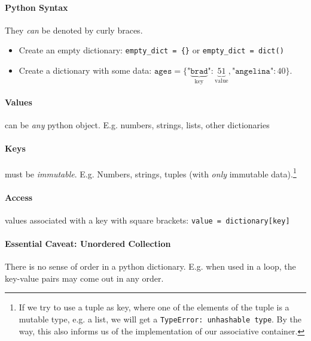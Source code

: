 \documentclass[12pt,letterpaper,twoside]{article}
\begin{document}
\vspace{-2ex}
\paragraph{Python Syntax}
They \emph{can} be denoted by curly braces.

\begin{itemize}
  \item
    Create an empty dictionary: \texttt{empty\_dict\ =\ \{\}} or
    \texttt{empty\_dict\ =\ dict()}
  \item
    Create a dictionary with some data:
      $\texttt{ages} = \{ \texttt{"}\underbrace{\texttt{brad}}_{\textrm{key}}\texttt{"} : \underbrace{51}_{\textrm{value}}, \texttt{"angelina"} : 40 \}$.
\end{itemize}

\vspace{-5ex}
\paragraph{Values} can be \emph{any} python object. E.g. numbers, strings, lists, other dictionaries

\vspace{-2ex}
\paragraph{Keys} must be \emph{immutable}. 
E.g. Numbers, strings, tuples (with \emph{only} immutable data).\footnote{If we try to use a tuple as key, where one of the elements of the tuple
is a mutable type, e.g. a list, we will get a \texttt{TypeError: unhashable type}. By the way, this also informs us of the implementation of our associative container.}

\vspace{-2ex}
\paragraph{Access} values associated with a key with square brackets:
\texttt{value\ =\ dictionary{[}key{]}}

\paragraph{Essential Caveat: Unordered Collection}
There is no sense of order in a python dictionary. E.g. when used in a loop, the key-value pairs may come out in any order.

\vspace{-18pt}
\end{document}

